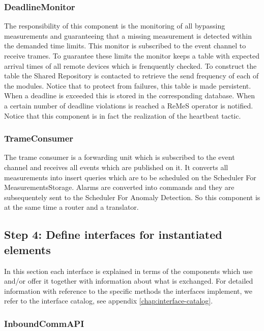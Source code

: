 \subsubsection{DeadlineMonitor}

\npar The responsibility of this component is the monitoring of all bypassing
measurements and guaranteeing that a missing measurement is detected within the
demanded time limits. This monitor is subscribed to the event channel to receive
trames. To guarantee these limits the monitor keeps a table with expected
arrival times of all remote devices which is frenquently checked. To construct
the table the Shared Repository is contacted to retrieve the send frequency of
each of the modules. Notice that to protect from failures, this table is made
persistent. When a deadline is exceeded this is stored in the corresponding
database. When a certain number of deadline violations is reached a ReMeS
operator is notified. Notice that this component is in fact the realization of
the heartbeat tactic.

\subsubsection{TrameConsumer}

\npar The trame consumer is a forwarding unit which is subscribed to the event
channel and receives all events which are published on it. It converts all
measurements into insert queries which are to be scheduled on the Scheduler For
MeasurementsStorage. Alarms are converted into commands and they are
subsequentely sent to the Scheduler For Anomaly Detection. So this component is
at the same time a router and a translator.

\subsection{Step 4: Define interfaces for instantiated elements}
\label{add:it2/interfaces}

\npar In this section each interface is explained in terms of the components
which use and/or offer it together with information about what is exchanged. For
detailed information with reference to the specific methods the interfaces
implement, we refer to the interface catalog, see appendix
\ref{chap:interface-catalog}.

\subsubsection{InboundCommAPI}

